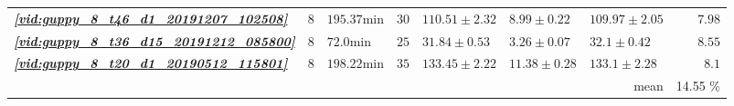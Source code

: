 \documentclass[9pt,lineno]{elife}
\newcommand{\vidref}[1]{\textit{\textbf{\ref{#1}}}}
\begin{document}
\begin{table}[h]
\begin{tabular}{l l l l | l l l | r}
\vidref{vid:guppy_8_t46_d1_20191207_102508} & 8 & $ 195.37 \mathrm{min} $ & $ 30 $ & $ 110.51 \pm 2.32 $ & $ 8.99 \pm 0.22 $ & $ 109.97 \pm 2.05 $ &$ 7.98 $ \\
\vidref{vid:guppy_8_t36_d15_20191212_085800} & 8 & $ 72.0 \mathrm{min} $ & $ 25 $ & $ 31.84 \pm 0.53 $ & $ 3.26 \pm 0.07 $ & $ 32.1 \pm 0.42 $ &$ 8.55 $ \\
\vidref{vid:guppy_8_t20_d1_20190512_115801} & 8 & $ 198.22 \mathrm{min} $ & $ 35 $ & $ 133.45 \pm 2.22 $ & $ 11.38 \pm 0.28 $ & $ 133.1 \pm 2.28 $ &$ 8.1 $ \\
\hline
\multicolumn{7}{r}{mean} & 14.55 \%\\

\bottomrule
\end{tabular}

\end{table}
\end{document}
